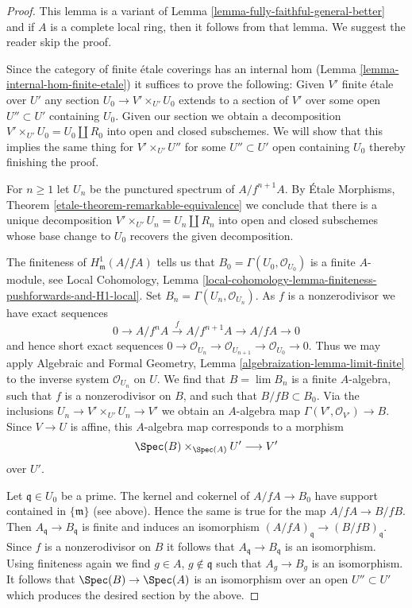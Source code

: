 \begin{proof}
This lemma is a variant of
Lemma \ref{lemma-fully-faithful-general-better}
and if $A$ is a complete local ring, then it follows from that lemma.
We suggest the reader skip the proof.

\medskip\noindent
Since the category of finite \'etale coverings has an internal hom
(Lemma \ref{lemma-internal-hom-finite-etale})
it suffices to prove the following: Given $V'$ finite \'etale over $U'$
any section $U_0 \to V' \times_{U'} U_0$ extends to a section of $V'$
over some open $U'' \subset U'$ containing $U_0$.
Given our section we obtain a decomposition
$V' \times_{U'} U_0 = U_0 \amalg R_0$ into open and closed subschemes.
We will show that this implies the same thing for $V' \times_{U'} U''$
for some $U'' \subset U'$ open containing $U_0$ thereby
finishing the proof.

\medskip\noindent
For $n \geq 1$ let $U_n$ be the punctured spectrum of $A/f^{n + 1}A$. By
\'Etale Morphisms, Theorem \ref{etale-theorem-remarkable-equivalence}
we conclude that there is a unique decomposition
$V' \times_{U'} U_n = U_n \amalg R_n$
into open and closed subschemes whose base change to $U_0$ recovers
the given decomposition.

\medskip\noindent
The finiteness of $H^1_\mathfrak m(A/fA)$ tells us that
$B_0 = \Gamma(U_0, \mathcal{O}_{U_0})$ is a finite $A$-module, see
Local Cohomology, Lemma
\ref{local-cohomology-lemma-finiteness-pushforwards-and-H1-local}.
Set $B_n = \Gamma(U_n, \mathcal{O}_{U_n})$.
As $f$ is a nonzerodivisor we have exact sequences
$$
0 \to A/f^nA \xrightarrow{f} A/f^{n + 1}A \to A/fA \to 0
$$
and hence short exact sequences $0 \to \mathcal{O}_{U_n} \to
\mathcal{O}_{U_{n + 1}} \to \mathcal{O}_{U_0} \to 0$.
Thus we may apply Algebraic and Formal Geometry, Lemma
\ref{algebraization-lemma-limit-finite}
to the inverse system $\mathcal{O}_{U_n}$ on $U$.
We find that $B = \lim B_n$ is a finite $A$-algebra, such that
$f$ is a nonzerodivisor on $B$,
and such that $B/fB \subset B_0$.
Via the inclusions $U_n \to V' \times_{U'} U_n \to V'$
we obtain an $A$-algebra map $\Gamma(V', \mathcal{O}_{V'}) \to B$.
Since $V \to U$ is affine, this $A$-algebra map corresponds to
a morphism
$$
\Spec(B) \times_{\Spec(A)} U' \longrightarrow V'
$$
over $U'$.

\medskip\noindent
Let $\mathfrak q \in U_0$ be a prime. The kernel and cokernel of
$A/fA \to B_0$ have support contained in $\{\mathfrak m\}$ (see above).
Hence the same is true for the map $A/fA \to B/fB$.
Then $A_\mathfrak q \to B_\mathfrak q$ is finite and
induces an isomorphism $(A/fA)_\mathfrak q \to (B/fB)_\mathfrak q$.
Since $f$ is a nonzerodivisor on $B$ it follows that
$A_\mathfrak q \to B_\mathfrak q$ is an isomorphism.
Using finiteness again we find $g \in A$, $g \not \in \mathfrak q$
such that $A_g \to B_g$ is an isomorphism.
It follows that $\Spec(B) \to \Spec(A)$ is an
isomorphism over an open $U'' \subset U'$ which produces
the desired section by the above.
\end{proof}

